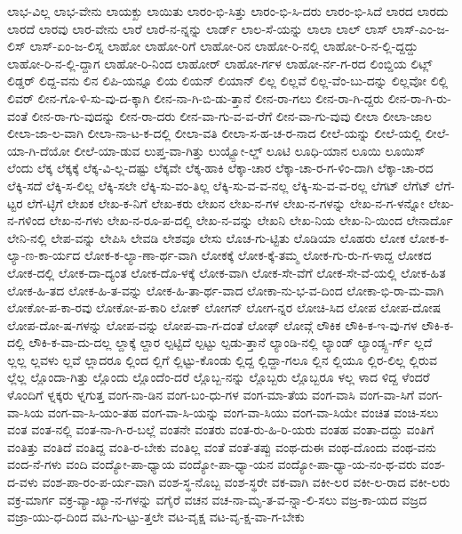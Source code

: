 {ಲಾಭ-ವಿಲ್ಲ
ಲಾಭ-ವೇನು
ಲಾಯಕ್ಖು
ಲಾಯಿತು
ಲಾರಂ-ಭಿ-ಸಿತ್ತು
ಲಾರಂ-ಭಿ-ಸಿ-ದರು
ಲಾರಂ-ಭಿ-ಸಿದೆ
ಲಾರದ
ಲಾರದು
ಲಾರದೆ
ಲಾರವು
ಲಾರ-ವೇನು
ಲಾರೆ
ಲಾರೆ-ನ-ನ್ನನ್ನು
ಲಾರ್ಡ್
ಲಾಲ-ಸೆ-ಯನ್ನು
ಲಾಲಾ
ಲಾಲ್
ಲಾಸ್
ಲಾಸ್-ಎಂ-ಜ-ಲಿಸ್
ಲಾಸ್-ಏಂ-ಜ-ಲಿಸ್ನ
ಲಾಹೋ
ಲಾಹೋ-ರಿಗೆ
ಲಾಹೋ-ರಿನ
ಲಾಹೋ-ರಿ-ನಲ್ಲಿ
ಲಾಹೋ-ರಿ-ನ-ಲ್ಲಿ-ದ್ದದ್ದು
ಲಾಹೋ-ರಿ-ನ-ಲ್ಲಿ-ದ್ದಾಗ
ಲಾಹೋ-ರಿ-ನಿಂದ
ಲಾಹೋರ್
ಲಾಹೋ-ರ್ಗಳ
ಲಾಹೋ-ರ್ನ-ಗ-ರದ
ಲಿಂಬ್ಡಿಯ
ಲಿಟ್ಲ್
ಲಿಡ್ಡರ್
ಲಿದ್ದ-ವನು
ಲಿನ
ಲಿಪಿ-ಯನ್ನೂ
ಲಿಯ
ಲಿಯನ್
ಲಿಯಾನ್
ಲಿಲ್ಲ
ಲಿಲ್ಲವೆ
ಲಿಲ್ಲ-ವೆಂ-ಬು-ದನ್ನು
ಲಿಲ್ಲವೋ
ಲಿಲ್ಲಿ
ಲಿವರ್
ಲೀನ-ಗೊ-ಳಿ-ಸು-ವು-ದ-ಕ್ಕಾಗಿ
ಲೀನ-ನಾ-ಗಿ-ಬಿ-ಡು-ತ್ತಾನೆ
ಲೀನ-ರಾ-ಗಲು
ಲೀನ-ರಾ-ಗಿ-ದ್ದರು
ಲೀನ-ರಾ-ಗಿ-ರು-ವಂತೆ
ಲೀನ-ರಾ-ಗು-ವುದನ್ನು
ಲೀನ-ರಾ-ದರು
ಲೀನ-ವಾ-ಗು-ವ-ವ-ರೆಗೆ
ಲೀನ-ವಾ-ಗು-ವುವು
ಲೀಲಾ
ಲೀಲಾ-ಜಾಲ
ಲೀಲಾ-ಜಾ-ಲ-ವಾಗಿ
ಲೀಲಾ-ನಾ-ಟ-ಕ-ದಲ್ಲಿ
ಲೀಲಾ-ವತಿ
ಲೀಲಾ-ಸ-ಹ-ಚ-ರ-ನಾದ
ಲೀಲೆ-ಯನ್ನು
ಲೀಲೆ-ಯಲ್ಲಿ
ಲೀಲೆ-ಯಾ-ಗಿ-ದೆಯೋ
ಲೀಲೆ-ಯಾ-ಡುವ
ಲುಪ್ತ-ವಾ-ಗಿತ್ತು
ಲುಯ್ಟ್ಪೋ-ಲ್ಡ್
ಲೂಟಿ
ಲೂಧಿ-ಯಾನ
ಲೂಯಿ
ಲೂಯಿಸ್
ಲೆಂದು
ಲೆಕ್ಕ
ಲೆಕ್ಕಕ್ಕೆ
ಲೆಕ್ಕ-ವಿ-ಲ್ಲ-ದಷ್ಟು
ಲೆಕ್ಕವೇ
ಲೆಕ್ಕ-ಹಾಕಿ
ಲೆಕ್ಕಾ-ಚಾರ
ಲೆಕ್ಕಾ-ಚಾ-ರ-ಗ-ಳಿಂ-ದಾಗಿ
ಲೆಕ್ಕಾ-ಚಾ-ರದ
ಲೆಕ್ಕಿ-ಸದೆ
ಲೆಕ್ಕಿ-ಸ-ಲಿಲ್ಲ
ಲೆಕ್ಕಿ-ಸಲೇ
ಲೆಕ್ಕಿ-ಸು-ವಂ-ತಿಲ್ಲ
ಲೆಕ್ಕಿ-ಸು-ವ-ವ-ನಲ್ಲ
ಲೆಕ್ಕಿ-ಸು-ವ-ವ-ರಲ್ಲ
ಲೆಗಟ್
ಲೆಗೆಟ್
ಲೆಗೆ-ಟ್ಟರ
ಲೆಗೆ-ಟ್ಳಿಗೆ
ಲೇಖಕ
ಲೇಖ-ಕ-ನಿಗೆ
ಲೇಖ-ಕರು
ಲೇಖನ
ಲೇಖ-ನ-ಗಳ
ಲೇಖ-ನ-ಗಳನ್ನು
ಲೇಖ-ನ-ಗ-ಳನ್ನೋ
ಲೇಖ-ನ-ಗಳಿಂದ
ಲೇಖ-ನ-ಗಳು
ಲೇಖ-ನ-ರೂ-ಪ-ದಲ್ಲಿ
ಲೇಖ-ನ-ವನ್ನು
ಲೇಖನಿ
ಲೇಖ-ನಿಯ
ಲೇಖ-ನಿ-ಯಿಂದ
ಲೇನಾರ್ದೊ
ಲೇನಿ-ನಲ್ಲಿ
ಲೇಪ-ವನ್ನು
ಲೇಪಿಸಿ
ಲೇವಡಿ
ಲೇಶವೂ
ಲೇಸು
ಲೊಚ-ಗು-ಟ್ಟಿತು
ಲೊಡಿಯಾ
ಲೊಹರು
ಲೋಕ
ಲೋಕ-ಕ-ಲ್ಯಾ-ಣ-ಕಾ-ರ್ಯದ
ಲೋಕ-ಕ-ಲ್ಯಾ-ಣಾ-ರ್ಥ-ವಾಗಿ
ಲೋಕಕ್ಕೆ
ಲೋಕ-ಕ್ಕೆ-ತಮ್ಮ
ಲೋಕ-ಗು-ರು-ಗ-ಳಾದ್ದ
ಲೋಕದ
ಲೋಕ-ದಲ್ಲಿ
ಲೋಕ-ದಾ-ದ್ಯಂತ
ಲೋಕ-ದೊ-ಳಕ್ಕೆ
ಲೋಕ-ವಾಗಿ
ಲೋಕ-ಸೇ-ವೆಗೆ
ಲೋಕ-ಸೇ-ವೆ-ಯಲ್ಲಿ
ಲೋಕ-ಹಿತ
ಲೋಕ-ಹಿ-ತದ
ಲೋಕ-ಹಿ-ತ-ವನ್ನು
ಲೋಕ-ಹಿ-ತಾ-ರ್ಥ-ವಾದ
ಲೋಕಾ-ನು-ಭ-ವ-ದಿಂದ
ಲೋಕಾ-ಭಿ-ರಾ-ಮ-ವಾಗಿ
ಲೋಕೋ-ಪ-ಕಾ-ರವು
ಲೋಕೋ-ಪ-ಕಾರಿ
ಲೋಕ್
ಲೋಗನ್
ಲೋಗ-ನ್ನರ
ಲೋಚಿ-ಸಿದ
ಲೋಪ
ಲೋಪ-ದೋಷ
ಲೋಪ-ದೋ-ಷ-ಗಳನ್ನು
ಲೋಪ-ವನ್ನು
ಲೋಪ-ವಾ-ಗ-ದಂತೆ
ಲೋಫ್
ಲೋವ್ಗೆ
ಲೌಕಿಕ
ಲೌಕಿ-ಕ-ಇ-ವು-ಗಳ
ಲೌಕಿ-ಕ-ದಲ್ಲಿ
ಲೌಕಿ-ಕ-ವಾ-ದು-ದಲ್ಲ
ಲ್ದಾಕ್ಕೆ
ಲ್ದಾರ
ಲ್ಪಟ್ಟಿದೆ
ಲ್ಪಟ್ಟು
ಲ್ಪಡು-ತ್ತಾನೆ
ಲ್ಯಾಂಡಿ-ನಲ್ಲಿ
ಲ್ಯಾಂಡ್
ಲ್ಯಾಂಡ್ಸ್ಬ-ರ್ಗ್
ಲ್ಲದೆ
ಲ್ಲಲ್ಲ
ಲ್ಲವಳು
ಲ್ಲವೆ
ಲ್ಲಾದರೂ
ಲ್ಲಿಂದ
ಲ್ಲಿಗೆ
ಲ್ಲಿಟ್ಟು-ಕೊಂಡು
ಲ್ಲಿದ್ದ
ಲ್ಲಿದ್ದಾ-ಗಲೂ
ಲ್ಲಿನ
ಲ್ಲಿಯೂ
ಲ್ಲಿರ-ಲಿಲ್ಲ
ಲ್ಲಿರುವ
ಲ್ಲೆಲ್ಲ
ಲ್ಲೊಂದಾ-ಗಿತ್ತು
ಲ್ಲೊಂದು
ಲ್ಲೊಂದೆಂ-ದರೆ
ಲ್ಲೊಬ್ಬ-ನನ್ನು
ಲ್ಲೊಬ್ಬರು
ಲ್ಲೊಬ್ಬರೂ
ಳಲ್ಲ
ಳಾದ
ಳಿದ್ದ
ಳೆಂದರೆ
ಳೊಂದಿಗೆ
ಳ್ನಕ್ಕರು
ಳ್ನಗುತ್ತ
ವಂಗ-ನಾ-ಡಿನ
ವಂಗ-ಬಂ-ಧು-ಗಳ
ವಂಗ-ಮಾ-ತೆಯ
ವಂಗ-ವಾಸಿ
ವಂಗ-ವಾ-ಸಿಗೆ
ವಂಗ-ವಾ-ಸಿಯ
ವಂಗ-ವಾ-ಸಿ-ಯಂ-ತಹ
ವಂಗ-ವಾ-ಸಿ-ಯನ್ನು
ವಂಗ-ವಾ-ಸಿಯು
ವಂಗ-ವಾ-ಸಿಯೇ
ವಂಚಿತ
ವಂಚಿ-ಸಲು
ವಂತ
ವಂತ-ನಲ್ಲಿ
ವಂತ-ನಾ-ಗಿ-ರ-ಬಲ್ಲೆ
ವಂತನೇ
ವಂತರು
ವಂತ-ರು-ಹಿ-ರಿ-ಯರು
ವಂತಹ
ವಂತಾ-ದದ್ದು
ವಂತಿಗೆ
ವಂತಿತ್ತು
ವಂತಿದೆ
ವಂತಿದ್ದ
ವಂತಿ-ರ-ಬೇಕು
ವಂತಿಲ್ಲ
ವಂತೆ
ವಂತೆ-ತಪ್ಪು
ವಂಥ-ದುಈ
ವಂಥ-ದೊಂದು
ವಂಥ-ವನು
ವಂದ-ನೆ-ಗಳು
ವಂದಿ
ವಂದ್ಯೋ-ಪಾ-ಧ್ಯಾಯ
ವಂದ್ಯೋ-ಪಾ-ಧ್ಯಾ-ಯನ
ವಂದ್ಯೋ-ಪಾ-ಧ್ಯಾ-ಯ-ನಂ-ಥ-ವರು
ವಂಶ-ದ-ವಳು
ವಂಶ-ಪಾ-ರಂ-ಪ-ರ್ಯ-ವಾಗಿ
ವಂಶ-ಸ್ಥ-ನೊಬ್ಬ
ವಂಶ-ಸ್ಥರೇ
ವಕ-ವಾಗಿ
ವಕೀ-ಲರ
ವಕೀ-ಲ-ರಾದ
ವಕೀ-ಲರು
ವಕ್ರ-ಮಾರ್ಗ
ವಕ್ರ-ವ್ಯಾ-ಖ್ಯಾ-ನ-ಗಳನ್ನು
ವಗೈರೆ
ವಚನ
ವಚ-ನಾ-ಮೃ-ತ-ವ-ನ್ನಾ-ಲಿ-ಸಲು
ವಜ್ರ-ಕಾ-ಯದ
ವಜ್ರದ
ವಜ್ರಾ-ಯು-ಧ-ದಿಂದ
ವಟ-ಗು-ಟ್ಟು-ತ್ತಲೇ
ವಟ-ವೃಕ್ಷ
ವಟ-ವೃ-ಕ್ಷ-ವಾ-ಗ-ಬೇಕು
}
